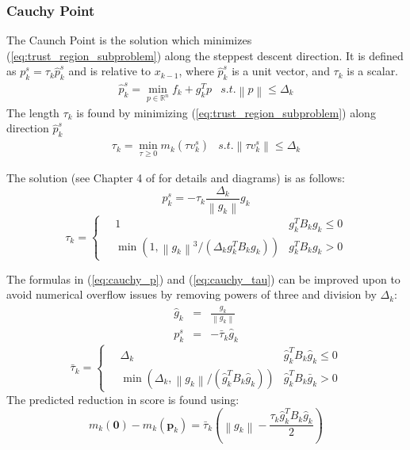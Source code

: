 \documentclass[peerreview,compsoc,onecolumn]{IEEEtran}
\newcommand{\R}{\mathbb{R}}
\newcommand{\norm}[1]{\left\lVert#1\right\rVert}
\begin{document}
\subsubsection{Cauchy Point}
\label{section:cauchy} 

The Caunch Point is the solution which minimizes (\ref{eq:trust_region_subproblem}) along the steppest descent direction. It is defined as $p^s_k = \tau_k \hat{p}^s_k$ and is relative to $x_{k-1}$, where $\hat{p}^s_k$ is a unit vector, and $\tau_k$ is a scalar.
\begin{equation}
\begin{array}{lr}
\hat{p}^s_k = \min\limits_{p\in \R^n} f_k + g_k^T p & s.t. \norm{p} \le \Delta_k
\end{array}
\end{equation}
The length $\tau_k$ is found by minimizing (\ref{eq:trust_region_subproblem}) along direction $\hat{p}^s_k$
\begin{equation}
\begin{array}{lr}
\tau_k = \min\limits_{\tau \ge 0} m_k(\tau v^s_k) & s.t. \norm{\tau v^s_k} \le \Delta_k
\end{array}
\end{equation}

The solution (see Chapter 4 of \cite{numopt2006} for details and diagrams) is as follows:
\begin{equation}
p^s_k = -\tau_k \frac{\Delta_k}{\norm{g_k}}g_k
\label{eq:cauchy_p}
\end{equation}
\begin{equation}
\tau_k = 
	\begin{cases}
		\quad 1 & g_k^T B_k g_k \le 0 \\
		\quad \min\left(1,\norm{g_k}^3/(\Delta_k g_k^T B_k g_k)\right) & g_k^T B_k g_k > 0
	\end{cases}
	\label{eq:cauchy_tau}
\end{equation}

The formulas in (\ref{eq:cauchy_p}) and (\ref{eq:cauchy_tau}) can be improved upon to avoid numerical overflow issues by removing powers of three and division by $\Delta_k$:
\begin{eqnarray}
\hat{g}_k &=& \frac{g_k}{\norm{g_k}} \\
p^s_k &=& -\bar{\tau}_k \hat{g}_k
\end{eqnarray}
\begin{equation}
\bar{\tau}_k = \begin{cases}
		\quad \Delta_k & \hat{g}_k^T B_k \hat{g}_k\le 0 \\
		\quad \min\left(\Delta_k,\norm{g_k}/(\hat{g}_k^T B_k \hat{g}_k)\right) & \hat{g}_k^T B_k \bar{g}_k > 0
	\end{cases}
\end{equation}
The predicted reduction in score is found using:
\begin{equation}
m_k(\bm{0})-m_k(\bm{p}_k) = \bar{\tau}_k \left(\norm{g_k} - \frac{\tau_k \hat{g}_k^T B_k \hat{g}_k}{2} \right)
\end{equation}
\end{document}
